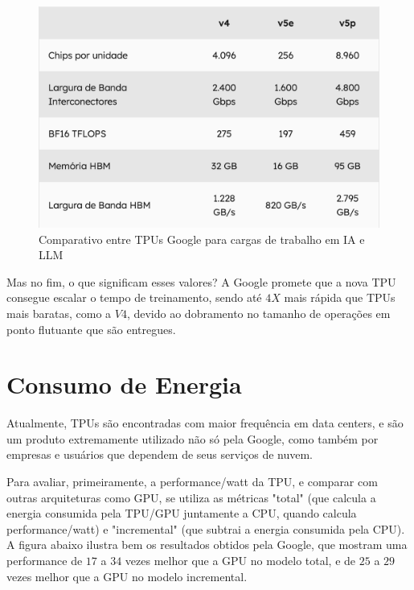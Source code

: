 \documentclass{report}
\begin{document}
\begin{figure}[h]
\includegraphics[scale=0.7]{comparativo-tpus}
\centering
\caption{Comparativo entre TPUs Google para cargas de trabalho em IA e LLM}
\end{figure}

Mas no fim, o que significam esses valores? A Google promete que a nova TPU consegue escalar o tempo de treinamento, sendo até $4X$ mais rápida que TPUs mais baratas, como a $V4$, devido ao dobramento no tamanho de operações em ponto flutuante que são entregues.

\chapter{Consumo de Energia}

Atualmente, TPUs são encontradas com maior frequência em data centers, e são um produto extremamente utilizado não só pela Google, como também por empresas e usuários que dependem de seus serviços de nuvem.

Para avaliar, primeiramente, a performance/watt da TPU, e comparar com outras arquiteturas como GPU, se utiliza as métricas "total" (que calcula a energia consumida pela TPU/GPU juntamente a CPU, quando calcula performance/watt) e "incremental" (que subtrai a energia consumida pela CPU). A figura abaixo ilustra bem os resultados obtidos pela Google, que mostram uma performance de $17$ a $34$ vezes melhor que a GPU no modelo total, e de $25$ a $29$ vezes melhor que a GPU no modelo incremental.
\end{document}
